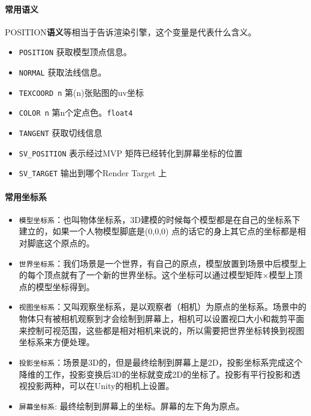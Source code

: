 \documentclass[UTF8,a4paper,12pt]{ctexbook}
\begin{document}
		\paragraph{常用语义}
			POSITION\textbf{语义}等相当于告诉渲染引擎，这个变量是代表什么含义。
			
			\begin{itemize}
				\item \verb|POSITION| 获取模型顶点信息。
				\item \verb|NORMAL| 获取法线信息。
				\item \verb|TEXCOORD n| 第(n)张贴图的uv坐标
				\item \verb|COLOR n| 第n个定点色。\verb|float4|
				\item \verb|TANGENT| 获取切线信息
				\item \verb|SV_POSITION| 表示经过MVP 矩阵已经转化到屏幕坐标的位置
				\item \verb|SV_TARGET| 输出到哪个Render Target 上
 			\end{itemize}
		
		\paragraph{常用坐标系}
			\begin{itemize}
				\item \verb|模型坐标系|：也叫物体坐标系，3D建模的时候每个模型都是在自己的坐标系下建立的，如果一个人物模型脚底是(0,0,0) 点的话它的身上其它点的坐标都是相对脚底这个原点的。 
				\item \verb|世界坐标系|：我们场景是一个世界，有自己的原点，模型放置到场景中后模型上的每个顶点就有了一个新的世界坐标。这个坐标可以通过模型矩阵×模型上顶点的模型坐标得到。 
				\item \verb|视图坐标系|：又叫观察坐标系，是以观察者（相机）为原点的坐标系。场景中的物体只有被相机观察到才会绘制到屏幕上，相机可以设置视口大小和裁剪平面来控制可视范围，这些都是相对相机来说的，所以需要把世界坐标转换到视图坐标系来方便处理。 
				\item \verb|投影坐标系|：场景是3D的，但是最终绘制到屏幕上是2D，投影坐标系完成这个降维的工作，投影变换后3D的坐标就变成2D的坐标了。投影有平行投影和透视投影两种，可以在Unity的相机上设置。 
				\item \verb|屏幕坐标系|: 最终绘制到屏幕上的坐标。屏幕的左下角为原点。
			\end{itemize}
\end{document}
